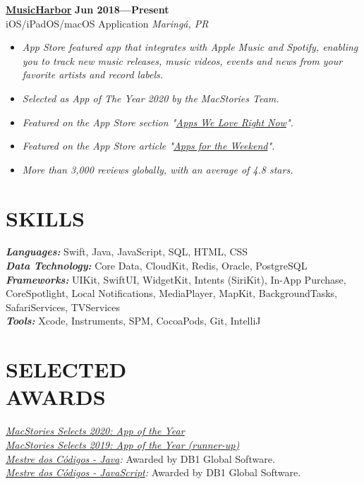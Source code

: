 \documentclass[line,margin]{res}
\begin{document}
\begin{resume}
  {\bf \href{https://apps.apple.com/us/app/musicharbor/id1440405750}{MusicHarbor}} \hfill {\bf Jun 2018---Present} \\
  iOS/iPadOS/macOS Application \hfill {\sl Maring\'a, PR}\\[-6pt]
    \begin{itemize}
    \item {\sl App Store featured app that integrates with Apple Music and Spotify, enabling you to track new music releases, music videos, events and news from your favorite artists and record labels.}
    \item {\sl Selected as App of The Year 2020 by the MacStories Team.}
    \item {\sl Featured on the App Store section "\href{https://github.com/marcosatanaka/resume-latex/blob/master/images/apps_we_love_right_now.png?raw=true}{Apps We Love Right Now}".}
    \item {\sl Featured on the App Store article "\href{https://apps.apple.com/us/story/id1516537723}{Apps for the Weekend}".}
    \item {\sl More than 3,000 reviews globally,  with an average of 4.8 stars.}
    \end{itemize}


\section{SKILLS}
  {\sl {\bf Languages:}} Swift, Java, JavaScript, SQL, HTML, CSS \\
  {\sl {\bf Data Technology:}} Core Data, CloudKit, Redis, Oracle, PostgreSQL \\
  {\sl {\bf Frameworks:}} UIKit, SwiftUI, WidgetKit, Intents (SiriKit), In-App Purchase, CoreSpotlight, Local Notifications, MediaPlayer, MapKit, BackgroundTasks, SafariServices, TVServices \\
  {\sl {\bf Tools:}} Xcode, Instruments, SPM, CocoaPods, Git, IntelliJ


\section{SELECTED \\ AWARDS}             
  {\sl \href{https://www.macstories.net/stories/macstories-selects-2020-recognizing-the-best-apps-of-the-year/#app-of-the-year}{MacStories Selects 2020: App of the Year}}\\
  {\sl \href{https://www.macstories.net/stories/macstories-selects-2019-recognizing-the-best-apps-of-the-year/#app-of-the-year-runner-up}{MacStories Selects 2019: App of the Year (runner-up)}}\\
  {\sl \href{https://mestredoscodigos.com.br/primeira-entrega-dos-pins-do-mestre-dos-codigos}{Mestre dos C\'odigos - Java}:} Awarded by DB1 Global Software.\\
  {\sl \href{https://mestredoscodigos.com.br/primeira-entrega-dos-pins-do-mestre-dos-codigos}{Mestre dos C\'odigos - JavaScript}:} Awarded by DB1 Global Software.\\
 

\end{resume}
\end{document}
